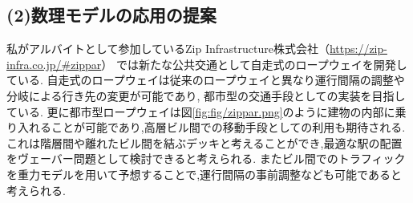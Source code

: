 \subsection*{(2)数理モデルの応用の提案}
私がアルバイトとして参加しているZip Infrastructure株式会社（\url{https://zip-infra.co.jp/#zippar}）
では新たな公共交通として自走式のロープウェイを開発している.
自走式のロープウェイは従来のロープウェイと異なり運行間隔の調整や分岐による行き先の変更が可能であり,
都市型の交通手段としての実装を目指している.
更に都市型ロープウェイは図\ref{fig:fig/zippar.png}のように建物の内部に乗り入れることが可能であり,高層ビル間での移動手段としての利用も期待される.
これは階層間や離れたビル間を結ぶデッキと考えることができ,最適な駅の配置をヴェーバー問題として検討できると考えられる.
またビル間でのトラフィックを重力モデルを用いて予想することで,運行間隔の事前調整なども可能であると考えられる.
